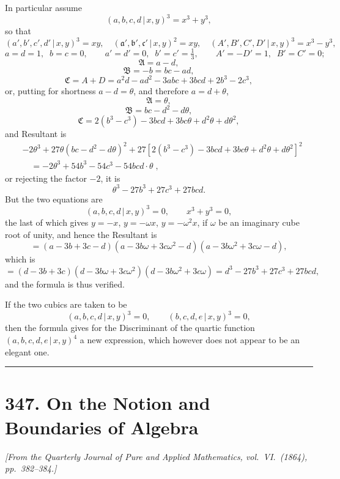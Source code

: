 \documentclass[11pt,a4paper]{article}
\providecommand{\mid}{\,|\,}
\begin{document}
\medskip

In particular assume
\[
(a, b, c, d \mid x, y)^3 = x^3 + y^3,
\]
so that
\[
(a', b', c', d' \mid x, y)^3 = xy, \quad (\mathfrak{a}', \mathfrak{b}', \mathfrak{c}' \mid x, y)^2 = xy, \quad (A', B', C', D' \mid x, y)^3 = x^3 - y^3,
\]
\[
a = d = 1,\;\; b = c = 0,\qquad a' = d' = 0,\;\; b' = c' = \tfrac{1}{3},\qquad A' = -D' = 1,\;\; B' = C' = 0;
\]
\[
\mathfrak{A} = a - d,
\]
\[
\mathfrak{B} = -b = bc - ad,
\]
\[
\mathfrak{C} = A + D = a^2 d - ad^2 - 3abc + 3bcd + 2b^3 - 2c^3,
\]
or, putting for shortness $a - d = \theta$, and therefore $a = d + \theta$,
\[
\mathfrak{A} = \theta,
\]
\[
\mathfrak{B} = bc - d^2 - d\theta,
\]
\[
\mathfrak{C} = 2(b^3 - c^3) - 3bcd + 3bc\theta + d^2 \theta + d\theta^2,
\]
and Resultant is
\begin{align*}
&  -2\theta^3 + 27\theta(bc - d^2 - d\theta)^2 + 27[2(b^3 - c^3) - 3bcd + 3bc\theta + d^2 \theta + d\theta^2]^2 \\
&\quad = -2\theta^3 + 54b^3 - 54c^3 - 54bcd \cdot \theta\;,
\end{align*}
or rejecting the factor $-2$, it is
\[
\theta^3 - 27 b^3 + 27 c^3 + 27 bcd.
\]
But the two equations are
\[
(a, b, c, d \mid x, y)^3 = 0,\qquad x^3 + y^3 = 0,
\]
the last of which gives $y = -x$, $y = -\omega x$, $y = -\omega^2 x$, if $\omega$ be an imaginary cube root of unity, and hence the Resultant is
\[
= (a - 3b + 3c - d)(a - 3b\omega + 3c\omega^2 - d)(a - 3b\omega^2 + 3c\omega - d),
\]
which is
\[
= (d - 3b + 3c)(d - 3b\omega + 3c\omega^2)(d - 3b\omega^2 + 3c\omega) = d^3 - 27 b^3 + 27 c^3 + 27 bcd,
\]
and the formula is thus verified.

\medskip

If the two cubics are taken to be
\[
(a, b, c, d \mid x, y)^3 = 0,\qquad (b, c, d, e \mid x, y)^3 = 0,
\]
then the formula gives for the Discriminant of the quartic function $(a, b, c, d, e \mid x, y)^4$ a new expression, which however does not appear to be an elegant one.

\bigskip
\noindent\rule{\textwidth}{0.4pt}
\bigskip

\section*{347. On the Notion and Boundaries of Algebra}

\noindent\textit{[From the Quarterly Journal of Pure and Applied Mathematics, vol.~VI.\ (1864), pp.~382--384.]}
\end{document}
